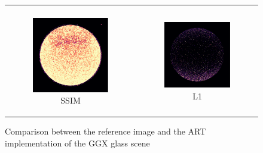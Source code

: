 \begin{figure}[h]
\begin{tabular}{cc}
\begin{subfigure}
			\caption{ART - our implementation}
		\end{subfigure} \\
		\begin{subfigure}
			{0.4\textwidth}\centering\includegraphics[width=\linewidth]{img/ggx_glass_SSIM.png}
			\caption{SSIM}
		\end{subfigure} 
		&
		\begin{subfigure}
			{0.4\textwidth}\centering\includegraphics[width=\linewidth]{img/ggx_glass_L1.png}
			\caption{L1}
		\end{subfigure}
	\end{tabular}
	\caption{Comparison between the reference image and the ART implementation of the GGX glass scene}
	\label{fig:compare_ggx_glass}
\end{figure}

